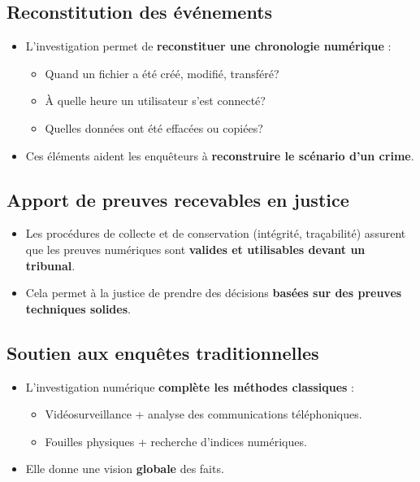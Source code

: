 \documentclass[12pt,a4paper]{article}
\begin{document}
\subsection{Reconstitution des événements}

\begin{itemize}[leftmargin=*]
    \item L'investigation permet de \textbf{reconstituer une chronologie numérique} :
    \begin{itemize}
        \item Quand un fichier a été créé, modifié, transféré?
        \item À quelle heure un utilisateur s'est connecté?
        \item Quelles données ont été effacées ou copiées?
    \end{itemize}
    \item Ces éléments aident les enquêteurs à \textbf{reconstruire le scénario d'un crime}.
\end{itemize}

\subsection{Apport de preuves recevables en justice}

\begin{itemize}[leftmargin=*]
    \item Les procédures de collecte et de conservation (intégrité, traçabilité) assurent que les preuves numériques sont \textbf{valides et utilisables devant un tribunal}.
    \item Cela permet à la justice de prendre des décisions \textbf{basées sur des preuves techniques solides}.
\end{itemize}

\subsection{Soutien aux enquêtes traditionnelles}

\begin{itemize}[leftmargin=*]
    \item L'investigation numérique \textbf{complète les méthodes classiques} :
    \begin{itemize}
        \item Vidéosurveillance + analyse des communications téléphoniques.
        \item Fouilles physiques + recherche d'indices numériques.
    \end{itemize}
    \item Elle donne une vision \textbf{globale} des faits.
\end{itemize}
\end{document}
